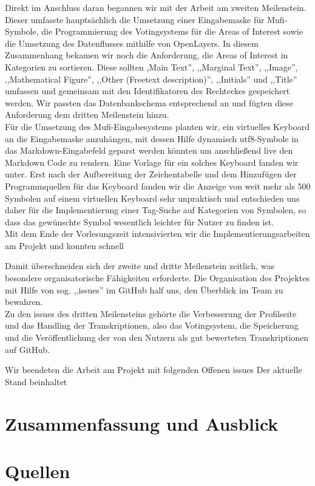 \documentclass{article}
\begin{document}
Direkt im Anschluss daran begannen wir mit der Arbeit am zweiten Meilenstein. 
Dieser umfasste hauptsächlich die Umsetzung einer Eingabemaske für Mufi-Symbole, die Programmierung des Votingsystems für die Areas of Interest sowie die Umsetzung des Datenflusses mithilfe von OpenLayers.
In diesem Zusammenhang bekamen wir noch die Anforderung, die Areas of Interest in Kategorien zu sortieren. Diese sollten ,Main Text'', ,,Marginal Text'', ,,Image'', ,,Mathematical Figure'', ,,Other (Freetext description)'', ,,Initials'' und ,,Title'' 
umfassen und gemeinsam mit den Identifikatoren des Rechteckes gespeichert werden.
Wir passten das Datenbankschema entsprechend an und fügten diese Anforderung dem dritten Meilenstein hinzu.\\
Für die Umsetzung des Mufi-Eingabesystems planten wir, ein virtuelles Keyboard an die Eingabemaske anzuhängen, 
mit dessen Hilfe dynamisch utf8-Symbole in das Markdown-Eingabefeld geparst werden könnten 
um anschließend live den Markdown Code zu rendern.
Eine Vorlage für ein solches Keyboard fanden wir unter. %
Erst nach der Aufbereitung der Zeichentabelle und dem Hinzufügen der Programmquellen für das Keyboard fanden wir die Anzeige von weit mehr als 500 Symbolen auf einem virtuellen Keyboard sehr unpraktisch und 
entschieden uns daher für die Implementierung einer Tag-Suche auf Kategorien von Symbolen, so dass das gewünschte Symbol wesentlich leichter für Nutzer zu finden ist.\\
Mit dem Ende der Vorlesungszeit intensivierten wir die Implementierungsarbeiten am Projekt und konnten schnell 

Damit überschneiden sich der zweite und dritte Meilenstein zeitlich, was besondere organisatorische Fähigkeiten erforderte.
Die Organisation des Projektes mit Hilfe von sog. ,,issues'' im GitHub half uns, den Überblick im Team zu bewahren.\\
Zu den issues des dritten Meilensteins gehörte die Verbesserung der Profilseite und das Handling der Transkriptionen, also das Votingsystem, die Speicherung und die Veröffentlichung der von den Nutzern als gut bewerteten Transkriptionen auf GitHub.

Wir beendeten die Arbeit am Projekt mit folgenden Offenen issues
Der aktuelle Stand beinhaltet


\section{Zusammenfassung und Ausblick}

\section*{Quellen}
  \printbibliography[%
    heading=bibintoc, %
  ]
\end{document}
